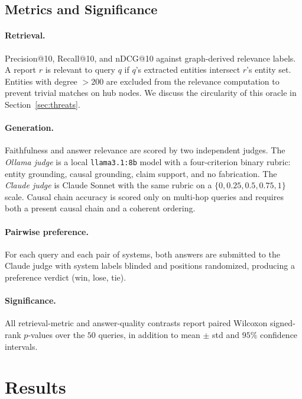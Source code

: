\documentclass[10pt,a4paper]{article}
\begin{document}
\subsection{Metrics and Significance}

\paragraph{Retrieval.}
Precision@10, Recall@10, and nDCG@10 against graph-derived relevance
labels. A report $r$ is relevant to query $q$ if $q$'s extracted
entities intersect $r$'s entity set. Entities with degree $> 200$ are
excluded from the relevance computation to prevent trivial matches on
hub nodes. We discuss the circularity of this oracle in
Section~\ref{sec:threats}.

\paragraph{Generation.}
Faithfulness and answer relevance are scored by two independent
judges. The \emph{Ollama judge} is a local \texttt{llama3.1:8b} model
with a four-criterion binary rubric: entity grounding, causal
grounding, claim support, and no fabrication. The \emph{Claude judge}
is Claude Sonnet with the same rubric on a
$\{0, 0.25, 0.5, 0.75, 1\}$ scale. Causal chain accuracy is scored
only on multi-hop queries and requires both a present causal chain
and a coherent ordering.

\paragraph{Pairwise preference.}
For each query and each pair of systems, both answers are submitted
to the Claude judge with system labels blinded and positions
randomized, producing a preference verdict (win, lose, tie).

\paragraph{Significance.}
All retrieval-metric and answer-quality contrasts report paired
Wilcoxon signed-rank $p$-values over the $50$ queries, in addition to
mean $\pm$ std and $95\%$ confidence intervals.

\section{Results}
\label{sec:results}
\end{document}
